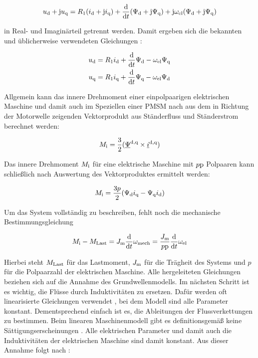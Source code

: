 \begin{align}
	u_{\mathrm{d}} + \mathrm{j}u_{\mathrm{q}} = R_{\mathrm{1}}(i_{\mathrm{d}}+\mathrm{j}i_{\mathrm{q}}) + \frac{\mathrm{d}}{\mathrm{d}t}(\Psi_{\mathrm{d}}+\mathrm{j}\Psi_{\mathrm{q}}) + \mathrm{j}\omega_{\mathrm{el}}(\Psi_{\mathrm{d}}+\mathrm{j}\Psi_{\mathrm{q}})
\end{align}

in  Real- und Imaginärteil getrennt werden. Damit ergeben sich die bekannten und üblicherweise verwendeten Gleichungen \autocite{schroder2001}:

	\begin{align}
		u_{\mathrm{d}} &= R_{\mathrm{1}}i_{\mathrm{d}} + \frac{\mathrm{d}}{\mathrm{d}t}\Psi_{\mathrm{d}}-\omega_{\mathrm{el}}\Psi_{\mathrm{q}} \label{eqn:ud-gleichung}\\
		u_{\mathrm{q}} &= R_{\mathrm{1}}i_{\mathrm{q}} + \frac{\mathrm{d}}{\mathrm{d}t}\Psi_{\mathrm{q}}-\omega_{\mathrm{el}}\Psi_{\mathrm{d}} \label{eqn:uq-gleichung}
	\end{align}

Allgemein kann das innere Drehmoment einer einpolpaarigen elektrischen Maschine und damit auch im Speziellen einer PMSM nach \textcite{kellner2012} aus dem in Richtung der Motorwelle zeigenden Vektorprodukt aus Ständerfluss und Ständerstrom berechnet werden:

\begin{align}
	M_{\mathrm{i}} = \frac{3}{2}(\underline{\Psi}^{\mathrm{d,q}} \times \underline{i}^{\mathrm{d,q}}) 
\end{align}

Das innere Drehmoment $M_{\mathrm{i}}$ für eine elektrische Maschine mit $p\mathrm{p}$ Polpaaren kann schließlich nach Auswertung des Vektorproduktes ermittelt werden:

	\begin{align}
M_{\mathrm{i}} = \frac{3p}{2} ( \Psi_{\mathrm{d}}i_{\mathrm{q}} - \Psi_{\mathrm{q}}i_{\mathrm{d}} ) \label{eqn:mi-gleichung}
	\end{align}

Um das System vollständig zu beschreiben, fehlt noch die mechanische Bestimmungsgleichung

\begin{align}
	M_{\mathrm{i}} - M_{\mathrm{Last}} = J_{\mathrm{m}} \frac{\mathrm{d}}{\mathrm{d}t}\omega_{\mathrm{mech}} = \frac{J_{\mathrm{m}}}{p\mathrm{p}} \frac{\mathrm{d}}{\mathrm{d}t}\omega_{\mathrm{el}} \label{eqn:mechanische-gleichung}
\end{align}

Hierbei steht $M_{\mathrm{Last}}$ für das Lastmoment, $J_{\mathrm{m}}$ für die Trägheit des Systems und $p$ für die Polpaarzahl der elektrischen Maschine.
Alle hergeleiteten Gleichungen beziehen sich auf die Annahme des Grundwellenmodells.
Im nächsten Schritt ist es wichtig, die Flüsse durch Induktivitäten zu ersetzen.
Dafür werden oft linearisierte Gleichungen verwendet \autocite{schroder2001}, bei dem Modell sind alle Parameter konstant.
Dementsprechend einfach ist es, die Ableitungen der Flussverkettungen zu bestimmen.
Beim linearen Maschinenmodell gibt es definitionsgemäß keine Sättigungserscheinungen \autocites{mullerII2008}{schroder2001}.
Alle elektrischen Parameter und damit auch die Induktivitäten der elektrischen Maschine sind damit konstant.
Aus dieser Annahme folgt nach \autocite{schroder2001}:

